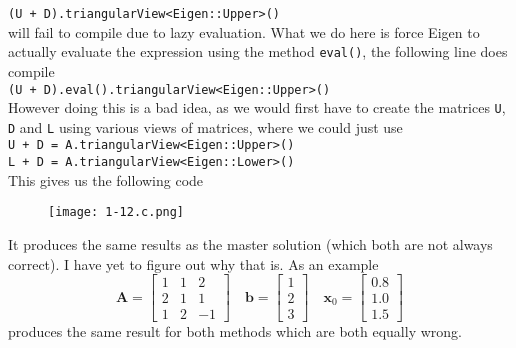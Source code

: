 \documentclass{article}
\begin{document}
\verb|(U + D).triangularView<Eigen::Upper>()| \\[1mm]
will fail to compile due to lazy evaluation. What we do here is force Eigen to actually evaluate the expression using the method \verb|eval()|, the following line does compile \\[2mm]
\verb|(U + D).eval().triangularView<Eigen::Upper>()| \\[1mm]
However doing this is a bad idea, as we would first have to create the matrices \verb|U|, \verb|D| and \verb|L| using various views of matrices, where we could just use \\[2mm]
\verb|U + D = A.triangularView<Eigen::Upper>()| \\
\verb|L + D = A.triangularView<Eigen::Lower>()| \\[1mm]
This gives us the following code
\begin{figure}[!hbt]
    \centering
\texttt{[image: 1-12.c.png]}
\end{figure}

\noindent It produces the same results as the master solution (which both are not always correct). I have yet to figure out why that is. As an example
\begin{equation*}
    \mathbf{A} = \begin{bmatrix}
        1 & 1 & 2 \\
        2 & 1 & 1 \\
        1 & 2 & -1
    \end{bmatrix} \quad 
    \mathbf{b} = \begin{bmatrix}
        1 \\ 2 \\ 3
    \end{bmatrix} \quad \mathbf{x}_{0} = \begin{bmatrix}
        0.8 \\
        1.0 \\
        1.5
    \end{bmatrix}
\end{equation*}
produces the same result for both methods which are both equally wrong. 
\end{document}
